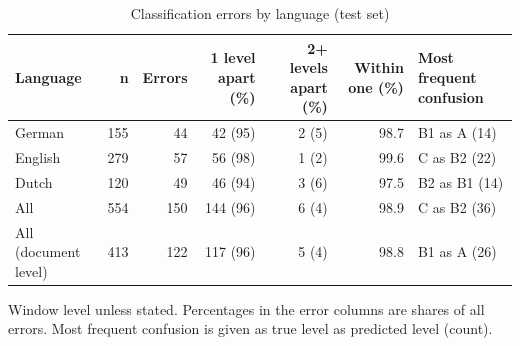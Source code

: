 \begin{table}[htbp]
\centering
\small
\begin{threeparttable}
\caption{Classification errors by language (test set)}
\label{tab:clf-errors}
\begin{tabular}{lrrrrrl}
\hline
Language & n & Errors & 1 level apart (\%) & 2+ levels apart (\%) & Within one (\%) & Most frequent confusion \\
\hline
German & 155 & 44 & 42 (95) & 2 (5) & 98.7 & B1 as A (14) \\
English & 279 & 57 & 56 (98) & 1 (2) & 99.6 & C as B2 (22) \\
Dutch & 120 & 49 & 46 (94) & 3 (6) & 97.5 & B2 as B1 (14) \\
\hline
All & 554 & 150 & 144 (96) & 6 (4) & 98.9 & C as B2 (36) \\
\hline
All (document level) & 413 & 122 & 117 (96) & 5 (4) & 98.8 & B1 as A (26) \\
\hline
\end{tabular}
\begin{tablenotes}
\footnotesize
\item Window level unless stated. Percentages in the error columns are shares of all errors. Most frequent confusion is given as true level as predicted level (count).
\end{tablenotes}
\end{threeparttable}
\end{table}
